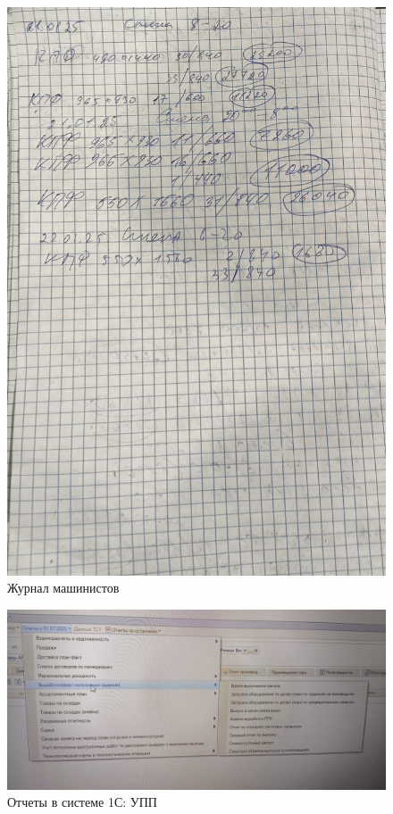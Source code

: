 \begin{figure}
\begin{center}
 \includegraphics[height=0.9\textheight, keepaspectratio]{Pics/VI журнал машинистов.jpg}
\end{center}
 \caption{Журнал машинистов}
 \label{pic:VI журнал машинистов}
\end{figure}

\begin{figure}
\begin{center}
 \includegraphics[height=0.32\textheight, keepaspectratio]{Pics/III отчеты 2.jpg}
\end{center}
 \caption{Отчеты в системе 1С: УПП}
 \label{pic:III отчеты 2}
\end{figure}

